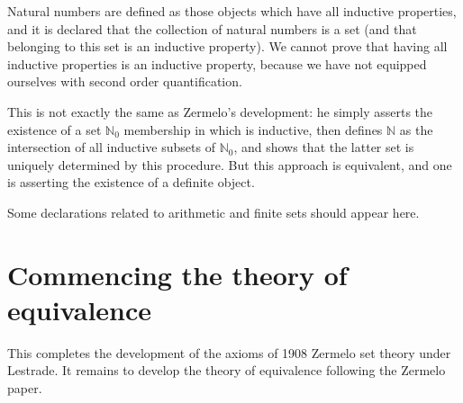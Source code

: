 \documentclass[12pt]{article}
\begin{document}
Natural numbers are defined as those objects which have all inductive properties, and it is declared that the collection of natural numbers is a set (and that belonging to this set
is an inductive property).  We cannot prove that having all inductive properties is an inductive property, because we have not equipped ourselves with second order quantification.

This is not exactly the same as Zermelo's development:  he simply asserts the existence of a set ${\mathbb N}_0$ membership in which is inductive, then defines
$\mathbb N$ as the intersection of all inductive subsets of ${\mathbb N}_0$, and shows that the latter set is uniquely determined by this procedure.  But this approach is
equivalent, and one is asserting the existence of a definite object.

Some declarations related to arithmetic and finite sets should appear here.

\section{Commencing the theory of equivalence}

This completes the development of the axioms of 1908 Zermelo set theory under Lestrade.  It remains to develop the theory of equivalence following the Zermelo paper.
\end{document}
